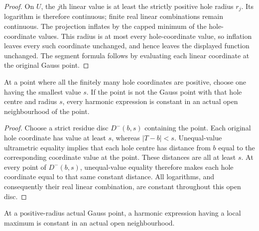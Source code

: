 \begin{proof}
On $U$, the $j$th linear value is at least the strictly positive hole radius
$r_j$. Its logarithm is therefore continuous; finite real linear combinations
remain continuous. The projection inflates by the capped minimum of the
hole-coordinate values. This radius is at most every hole-coordinate value,
so inflation leaves every such coordinate unchanged, and hence leaves the
displayed function unchanged. The segment formula follows by evaluating each
linear coordinate at the original Gauss point.
\end{proof}

\begin{lemma}\label{lem:fc-harmonic-nongauss-constant}
\leanok
{}
At a point where all the finitely many hole coordinates are positive, choose
one having the smallest value $s$. If the point is not the Gauss point with
that hole centre and radius $s$, every harmonic expression is constant in
an actual open neighbourhood of the point.
\end{lemma}

\begin{proof}
Choose a strict residue disc $D^-(b,s)$ containing the point. Each original
hole coordinate has value at least $s$, whereas $|T-b|<s$. Unequal-value
ultrametric equality implies that each hole centre has distance from $b$
equal to the corresponding coordinate value at the point. These distances
are all at least $s$. At every point of $D^-(b,s)$, unequal-value equality
therefore makes each hole coordinate equal to that same constant distance.
All logarithms, and consequently their real linear combination, are constant
throughout this open disc.
\end{proof}

\begin{lemma}\label{lem:fc-harmonic-gauss-maximum}
\leanok
{}
At a positive-radius actual Gauss point, a harmonic expression having a
local maximum is constant in an actual open neighbourhood.
\end{lemma}

